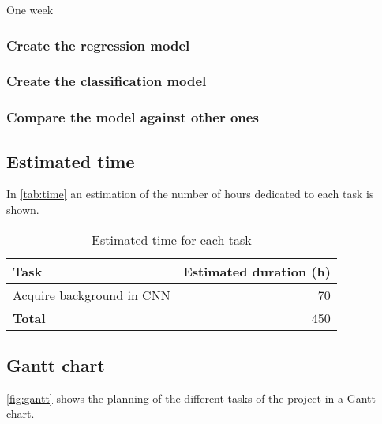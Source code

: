 One week

\subsubsection{Create the regression model}

\subsubsection{Create the classification model}

\subsubsection{Compare the model against other ones}

\subsection{Estimated time}

In \autoref{tab:time} an estimation of the number of hours dedicated to each task is shown.

\begin{table}
    \centering{}
    \begin{tabular}{|l|r|}
        \hline
        Task & Estimated duration (h) \\ \hline \hline
        Acquire background in CNN & 70 \\ \hline
    
        \hline \hline
        \textbf{Total} & 450 \\
        \hline
    \end{tabular}
    \caption{Estimated time for each task \label{tab:time}}
\end{table}

\subsection{Gantt chart}

\autoref{fig:gantt} shows the planning of the different tasks of the project in a Gantt chart.

